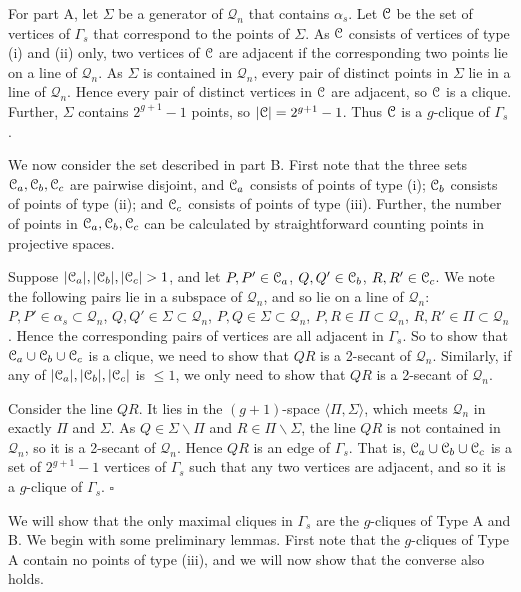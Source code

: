 \documentclass[12pt]{article}
\newenvironment{proof}{\noindent{\bf Proof}\hspace{0.5em}}
    { \null  \hfill $\square$ \par}
\newcommand\C{{\cal C}}
\newcommand{\Q}{\mathscr Q}
\renewcommand\setminus{\backslash}
\newcommand\TODO[1]{{\color{Purple} #1}}
\begin{document}
\begin{proof} 
For part A, let $\Sigma$ be a generator of $\Q_n$ that contains $\alpha_s$. 
Let $\C$ be the set of vertices of $\Gamma_s$ that correspond to the points of $\Sigma$. As  $\C$ consists of vertices of type (i) and (ii) only, two vertices of $\C$ are adjacent if the corresponding two points lie on a line of $\Q_n$. As $\Sigma$ is contained in $\Q_n$, every pair of distinct points in $\Sigma$ lie in a line of $\Q_n$. Hence every pair of distinct vertices in $\C$ are adjacent, so $\C$ is a clique. Further, $\Sigma$ contains $2^{g+1}-1$ points, so $|\C|=2^{g+1}-1$. Thus $\C$ is a $g$-clique of $\Gamma_s$. 

We now consider the set described in part B.  
First note that the three sets $\C_a, \C_b,\C_c$ are pairwise disjoint, and $\C_a$ consists of points  of type (i);
$\C_b$ consists of points of type (ii);
and $\C_c$ consists of points of type (iii). Further, the number of points in $\C_a, \C_b,\C_c$ can be calculated by straightforward counting points in projective spaces. 

Suppose $|\C_a|,|\C_b|,|\C_c|>1$, and let
 $P,P'\in\C_a$, $Q,Q'\in\C_b$, $R,R'\in\C_c$. We note the following pairs lie in a subspace of $\Q_n$, and so lie on a line of $\Q_n$:
 $P,P'\in\alpha_s\subset\Q_n$, 
 $Q,Q'\in\Sigma\subset\Q_n$, 
 $P,Q\in\Sigma\subset\Q_n$, 
 $P,R\in\Pi\subset\Q_n$,
 $R,R'\in\Pi\subset\Q_n$.
 Hence the corresponding pairs of vertices are all adjacent in $\Gamma_s$. 
 So to show that $\C_a\cup\C_b\cup\C_c$ is a clique, we need 
to show that $QR$ is a 2-secant of $\Q_n$.
Similarly, if any of $|\C_a|,|\C_b|,|\C_c|$ is $\leq1$, we only need to show that $QR$ is a 2-secant of $\Q_n$.



Consider the line $QR$. It lies in  the $(g+1)$-space $\langle\Pi,\Sigma\rangle$, which meets $\Q_n$ in exactly $\Pi$ and $\Sigma$. As $Q\in\Sigma\setminus\Pi$ and $R\in\Pi\setminus\Sigma$,  the line $QR$ is not contained in $\Q_n$, so it is a 2-secant of $\Q_n$. Hence $QR$ is an edge of $\Gamma_s$. That is, $\C_a\cup\C_b\cup\C_c$ is a set of $2^{g+1}-1$ vertices of $\Gamma_s$ such that any two vertices are adjacent, and so it is a $g$-clique of $\Gamma_s$. 
\end{proof}

We will show that  the only maximal cliques in $\Gamma_s$ are the $g$-cliques of Type A and B. We begin with some preliminary lemmas. 
First note that the $g$-cliques of Type A contain no points of type (iii), \TODO{ and we will now show that } the converse also holds. 
\end{document}
